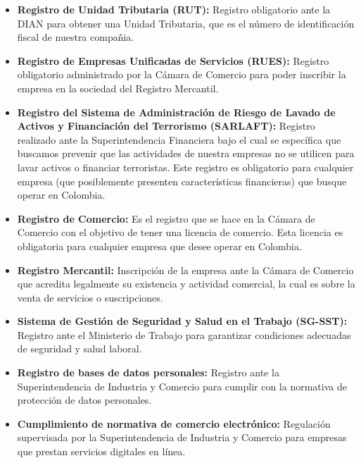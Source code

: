 \begin{itemize}
	\item \textbf{Registro de Unidad Tributaria (RUT):} Registro obligatorio ante la DIAN para obtener una Unidad Tributaria, que es el número de identificación fiscal de nuestra compañia.
	
	\item \textbf{Registro de Empresas Unificadas de Servicios (RUES):} Registro obligatorio administrado por la Cámara de Comercio para poder inscribir la empresa en la sociedad del Registro Mercantil.
	
	\item \textbf{Registro del Sistema de Administración de Riesgo de Lavado de Activos y Financiación del Terrorismo (SARLAFT):} Registro realizado ante la Superintendencia Financiera bajo el cual se específica que buscamos prevenir que las actividades de nuestra empresas no se utilicen para lavar activos o financiar terroristas. Este registro es obligatorio para cualquier empresa (que posiblemente presenten características financieras) que busque operar en Colombia.
	
	\item \textbf{Registro de Comercio:} Es el registro que se hace en la Cámara de Comercio con el objetivo de tener una licencia de comercio. Esta licencia es obligatoria para cualquier empresa que desee operar en Colombia.
	
	\item \textbf{Registro Mercantil:} Inscripción de la empresa ante la Cámara de Comercio que acredita legalmente su existencia y actividad comercial, la cual es sobre la venta de servicios o suscripciones.
	
	\item \textbf{Sistema de Gestión de Seguridad y Salud en el Trabajo (SG-SST):} Registro ante el Ministerio de Trabajo para garantizar condiciones adecuadas de seguridad y salud laboral.
	
	\item \textbf{Registro de bases de datos personales:} Registro ante la Superintendencia de Industria y Comercio para cumplir con la normativa de protección de datos personales.
	
	\item \textbf{Cumplimiento de normativa de comercio electrónico:} Regulación supervisada por la Superintendencia de Industria y Comercio para empresas que prestan servicios digitales en línea.
\end{itemize}

